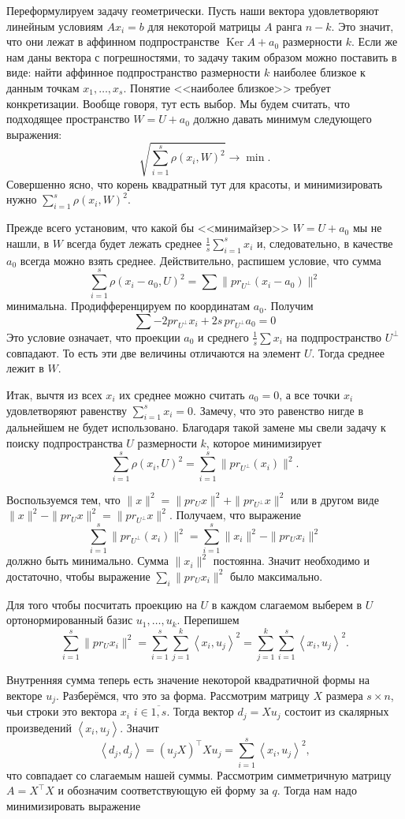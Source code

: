 \documentclass[10pt,a4paper,oneside]{book}
\theoremstyle{definition}
\newcommand{\ovl}{\overline}
\DeclareMathOperator{\Ker}{Ker}
\def\lan{\left\langle }
\def\ran{\right\rangle}
\begin{document}
Переформулируем задачу геометрически. Пусть наши вектора удовлетворяют линейным условиям $Ax_i=b$ для некоторой матрицы $A$ ранга $n-k$. Это значит, что они лежат в аффинном подпространстве $\Ker A + a_0$ размерности $k$. Если же нам даны вектора с погрешностями, то задачу таким образом можно поставить в виде: найти аффинное подпространство размерности $k$ наиболее близкое к данным точкам $x_1,\dots,x_s$. Понятие <<наиболее близкое>> требует конкретизации. Вообще говоря, тут есть выбор. Мы будем считать, что подходящее пространство $W=U+a_0$ должно давать минимум следующего выражения:
$$\sqrt{\sum_{i=1}^s \rho(x_i,W)^2} \to \min.$$
Совершенно ясно, что корень квадратный тут для красоты, и минимизировать нужно $\sum_{i=1}^s \rho(x_i,W)^2$.

Прежде всего установим, что какой бы <<минимайзер>> $W=U+a_0$ мы не нашли, в $W$ всегда будет лежать среднее $\frac{1}{s}\sum_{i=1}^s x_i$ и, следовательно, в качестве $a_0$ всегда можно взять среднее. Действительно, распишем условие, что сумма 
$$\sum_{i=1}^s \rho(x_i-a_0, U)^2=\sum \|pr_{U^{\bot}} (x_i-a_0)\|^2$$
минимальна.  Продифференцируем по координатам $a_0$. Получим $$\sum -2pr_{U^{\bot}} x_i + 2s \,pr_{U^{\bot}} a_0=0$$
 Это условие означает, что проекции $a_0$ и среднего $\frac{1}{s}\sum x_i$ на подпространство $U^{\bot}$ совпадают. То есть эти две величины отличаются на элемент $U$. Тогда среднее лежит в $W$. 

Итак, вычтя из всех $x_i$ их среднее можно считать $a_0=0$, а все точки $x_i$ удовлетворяют равенству $\sum_{i=1}^s x_i=0$. Замечу, что это равенство нигде в дальнейшем не будет использовано. Благодаря такой замене мы свели задачу к поиску подпространства $U$ размерности $k$, которое минимизирует 
$$\sum_{i=1}^s \rho(x_i, U)^2=\sum_{i=1}^s \|pr_{U^{\bot}} (x_i)\|^2.$$

Воспользуемся тем, что $\|x\|^2=\|pr_U x\|^2+\|pr_{U^{\bot}} x\|^2$ или в другом виде $\|x\|^2-\|pr_U x\|^2=\|pr_{U^{\bot}} x\|^2$. Получаем, что выражение
$$\sum_{i=1}^s \|pr_{U^{\bot}}(x_i)\|^2=\sum_{i=1}^s \|x_i\|^2-\|pr_U x_i\|^2$$
должно быть минимально. Сумма $\|x_i\|^2$ постоянна. Значит  необходимо и достаточно, чтобы выражение $\sum_i \|pr_U x_i\|^2$ было максимально.


Для того чтобы посчитать проекцию на $U$ в каждом слагаемом выберем в $U$ ортонормированный базис $u_1,\dots,u_k$. Перепишем
$$\sum_{i=1}^s \|pr_U x_i\|^2=\sum_{i=1}^s\sum_{j=1}^k \lan x_i,u_j\ran^2=\sum_{j=1}^k \sum_{i=1}^s \lan x_i,u_j\ran^2.$$

Внутренняя сумма теперь есть значение некоторой квадратичной формы на векторе $u_j$. Разберёмся, что это за форма. Рассмотрим матрицу $X$ размера $s\times n$, чьи строки это  вектора $x_i$ $i\in\ovl{1,s}$. Тогда вектор $d_j=Xu_j$ состоит из скалярных произведений  $\lan x_i, u_j\ran$. Значит 
$$\lan d_j,d_j\ran = (u_jX)^{\top}Xu_j = \sum_{i=1}^s \lan x_i,u_j\ran^2,$$ 
что совпадает со слагаемым нашей суммы. Рассмотрим симметричную матрицу $A=X^{\top}X$ и обозначим соответствующую ей форму за $q$. Тогда нам надо минимизировать выражение
\end{document}
